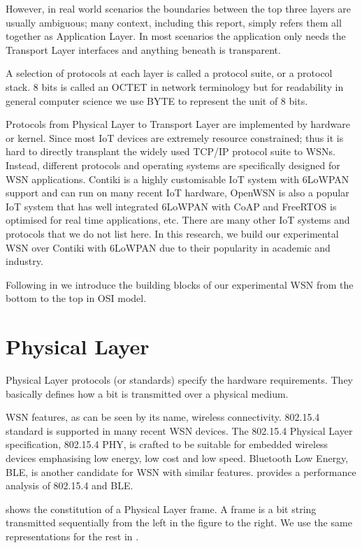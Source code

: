 However, in real world scenarios the boundaries between the top three layers are usually ambiguous; many context, including this report, simply refers them all together as Application Layer. In most scenarios the application only needs the Transport Layer interfaces and anything beneath is transparent.

A selection of protocols at each layer is called a protocol suite, or a protocol stack. 8 bits is called an OCTET in network terminology but for readability in general computer science we use BYTE to represent the unit of 8 bits.

Protocols from Physical Layer to Transport Layer are implemented by hardware or kernel. Since most IoT devices are extremely resource constrained; thus it is hard to directly transplant the widely used TCP/IP protocol suite to WSNs. Instead, different protocols and operating systems are specifically designed for WSN applications. Contiki\cite{Contiki} is a highly customisable IoT system with 6LoWPAN\cite{rfc4919} support and can run on many recent IoT hardware, OpenWSN\cite{OpenWSN} is also a popular IoT system that has well integrated 6LoWPAN with CoAP\cite{rfc7252} and FreeRTOS\cite{FreeRTOS} is optimised for real time applications, etc. There are many other IoT systems and protocols that we do not list here. In this research, we build our experimental WSN over Contiki with 6LoWPAN due to their popularity in academic and industry.

Following in  we introduce the building blocks of our experimental WSN from the bottom to the top in OSI model.

\section{Physical Layer}
Physical Layer protocols (or standards) specify the hardware requirements. They basically defines how a bit is transmitted over a physical medium.

WSN features, as can be seen by its name, wireless connectivity. 802.15.4\cite{802154} standard is supported in many recent WSN devices. The  802.15.4 Physical Layer specification, 802.15.4 PHY, is crafted to be suitable for embedded wireless devices emphasising low energy, low cost and low speed. Bluetooth Low Energy\cite{BLE}, BLE, is another candidate for WSN with similar features. \cite{802154BLE} provides a performance analysis of 802.15.4 and BLE.

 shows the constitution of a Physical Layer frame. A frame is a bit string transmitted sequentially from the left in the figure to the right. We use the same representations for the rest in .


